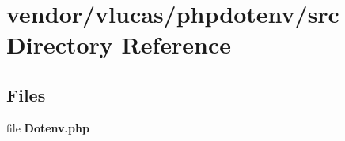 \section{vendor/vlucas/phpdotenv/src Directory Reference}
\label{dir_b41cddc3ad1f72614155e7d14a497ec8}
\subsection*{Files}
\begin{DoxyCompactItemize}
\item 
file {\bf Dotenv.\+php}
\end{DoxyCompactItemize}
